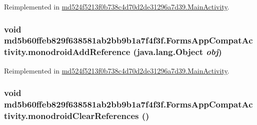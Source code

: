 Reimplemented in \hyperlink{classmd524f5213f0b738c4d70d2de31296a7d39_1_1_main_activity_1d35ea6707bf279c2c796c89d68b13ae}{md524f5213f0b738c4d70d2de31296a7d39.MainActivity}.\hypertarget{classmd5b60ffeb829f638581ab2bb9b1a7f4f3f_1_1_forms_app_compat_activity_1389ec337c7200cacb878f5e3c5b946c}{
\subsubsection[{monodroidAddReference}]{\setlength{\rightskip}{0pt plus 5cm}void md5b60ffeb829f638581ab2bb9b1a7f4f3f.FormsAppCompatActivity.monodroidAddReference (java.lang.Object {\em obj})}}
\label{classmd5b60ffeb829f638581ab2bb9b1a7f4f3f_1_1_forms_app_compat_activity_1389ec337c7200cacb878f5e3c5b946c}




Reimplemented in \hyperlink{classmd524f5213f0b738c4d70d2de31296a7d39_1_1_main_activity_c001ac4bc7c7713ba23345add551eb87}{md524f5213f0b738c4d70d2de31296a7d39.MainActivity}.\hypertarget{classmd5b60ffeb829f638581ab2bb9b1a7f4f3f_1_1_forms_app_compat_activity_8a2a2c0fe41e592284f243d8b007ecd0}{
\subsubsection[{monodroidClearReferences}]{\setlength{\rightskip}{0pt plus 5cm}void md5b60ffeb829f638581ab2bb9b1a7f4f3f.FormsAppCompatActivity.monodroidClearReferences ()}}
\label{classmd5b60ffeb829f638581ab2bb9b1a7f4f3f_1_1_forms_app_compat_activity_8a2a2c0fe41e592284f243d8b007ecd0}




